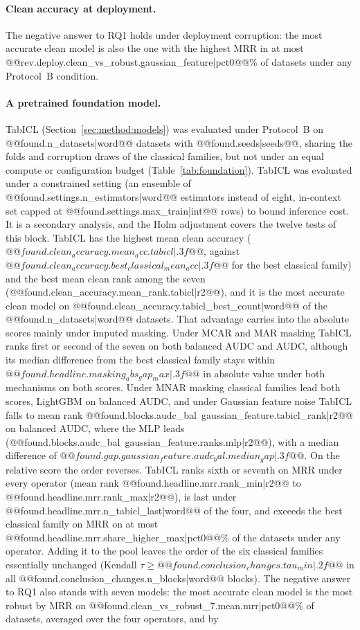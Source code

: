 \documentclass[pdflatex,sn-mathphys]{sn-jnl}
\theoremstyle{thmstyleone}
\theoremstyle{thmstyletwo}
\theoremstyle{thmstylethree}
\begin{document}
\paragraph{Clean accuracy at deployment.} The negative answer to RQ1 holds under deployment corruption: the most accurate clean model is also the one with the highest MRR in at most @@{rev.deploy.clean_vs_robust.gaussian_feature|pct0}@@\% of datasets under any Protocol~B condition.

\paragraph{A pretrained foundation model.} TabICL (Section~\ref{sec:method:models}) was evaluated under Protocol~B on @@{found.n_datasets|word}@@ datasets with @@{found.seeds|seeds}@@, sharing the folds and corruption draws of the classical families, but not under an equal compute or configuration budget (Table~\ref{tab:foundation}). TabICL was evaluated under a constrained setting (an ensemble of @@{found.settings.n_estimators|word}@@ estimators instead of eight, in-context set capped at @@{found.settings.max_train|int}@@ rows) to bound inference cost. It is a secondary analysis, and the Holm adjustment covers the twelve tests of this block. TabICL has the highest mean clean accuracy ($@@{found.clean_accuracy.mean_acc.tabicl|.3f}@@$, against $@@{found.clean_accuracy.best_classical_mean_acc|.3f}@@$ for the best classical family) and the best mean clean rank among the seven (@@{found.clean_accuracy.mean_rank.tabicl|r2}@@), and it is the most accurate clean model on @@{found.clean_accuracy.tabicl_best_count|word}@@ of the @@{found.n_datasets|word}@@ datasets. That advantage carries into the absolute scores mainly under imputed masking. Under MCAR and MAR masking TabICL ranks first or second of the seven on both balanced AUDC and AUDC, although its median difference from the best classical family stays within $@@{found.headline.masking_abs_gap_max|.3f}@@$ in absolute value under both mechanisms on both scores. Under MNAR masking classical families lead both scores, LightGBM on balanced AUDC, and under Gaussian feature noise TabICL falls to mean rank @@{found.blocks.audc_bal~gaussian_feature.tabicl_rank|r2}@@ on balanced AUDC, where the MLP leads (@@{found.blocks.audc_bal~gaussian_feature.ranks.mlp|r2}@@), with a median difference of $@@{found.gap.gaussian_feature.audc_bal.median_gap|.3f}@@$. On the relative score the order reverses. TabICL ranks sixth or seventh on MRR under every operator (mean rank @@{found.headline.mrr.rank_min|r2}@@ to @@{found.headline.mrr.rank_max|r2}@@), is last under @@{found.headline.mrr.n_tabicl_last|word}@@ of the four, and exceeds the best classical family on MRR on at most @@{found.headline.mrr.share_higher_max|pct0}@@\% of the datasets under any operator. Adding it to the pool leaves the order of the six classical families essentially unchanged (Kendall $\tau\ge@@{found.conclusion_changes.tau_min|.2f}@@$ in all @@{found.conclusion_changes.n_blocks|word}@@ blocks). The negative answer to RQ1 also stands with seven models: the most accurate clean model is the most robust by MRR on @@{found.clean_vs_robust_7.mean.mrr|pct0}@@\% of datasets, averaged over the four operators, and by 
\end{document}
